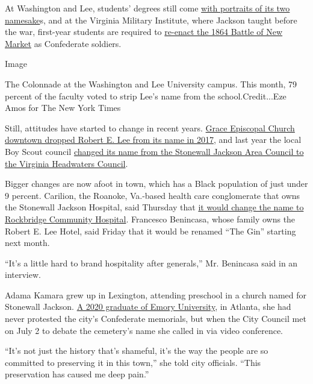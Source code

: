 At Washington and Lee, students' degrees still come
\href{https://www.law.com/2019/11/20/robert-e-lee-on-your-diploma-some-law-students-say-no-thanks/?slreturn=20200625074259}{with
portraits of its two namesake}s, and at the Virginia Military Institute,
where Jackson taught before the war, first-year students are required to
\href{https://www.vmi.edu/archives/civil-war-and-new-market/battle-of-new-market/new-market-ceremony-history/}{re-enact
the 1864 Battle of New Market} as Confederate soldiers.

Image

The Colonnade at the Washington and Lee University campus. This month,
79 percent of the faculty voted to strip Lee's name from the
school.Credit...Eze Amos for The New York Times

Still, attitudes have started to change in recent years.
\href{http://www.graceepiscopallexington.org/about-us/}{Grace Episcopal
Church downtown dropped Robert E. Lee from its name in 2017}, and last
year the local Boy Scout council
\href{https://www.whsv.com/content/news/Local-scouting-council-changes-name-from-Stonewall-Jackson-Area-Council-to-Virginia-Headwaters-Council-565449041.html}{changed
its name from the Stonewall Jackson Area Council to the Virginia
Headwaters Council}.

Bigger changes are now afoot in town, which has a Black population of
just under 9 percent. Carilion, the Roanoke, Va.-based health care
conglomerate that owns the Stonewall Jackson Hospital, said Thursday
that
\href{https://www.wsls.com/news/local/2020/07/24/carilion-to-rename-lexingtons-stonewall-jackson-hospital/}{it
would change the name to Rockbridge Community Hospital}. Francesco
Benincasa, whose family owns the Robert E. Lee Hotel, said Friday that
it would be renamed ``The Gin'' starting next month.

``It's a little hard to brand hospitality after generals,'' Mr.
Benincasa said in an interview.

Adama Kamara grew up in Lexington, attending preschool in a church named
for Stonewall Jackson.
\href{https://news.emory.edu/stories/2020/05/er_commencement_award_orator_kamara/campus.html}{A
2020 graduate of Emory University}, in Atlanta, she had never protested
the city's Confederate memorials, but when the City Council met on July
2 to debate the cemetery's name she called in via video conference.

``It's not just the history that's shameful, it's the way the people are
so committed to preserving it in this town,'' she told city officials.
``This preservation has caused me deep pain.''

